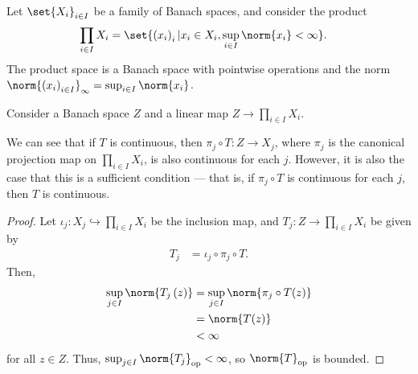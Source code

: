 \documentclass[10pt]{mypackage}
\begin{document}
  \begin{example}
    Let $\set{X_i}_{i\in I}$ be a family of Banach spaces, and consider the product
    \begin{align*}
      \prod_{i\in I}X_i &= \set{\left(x_i\right)_i| x_i\in X_i, \sup_{i\in I}\norm{x_i} < \infty}.
    \end{align*}
    The product space is a Banach space with pointwise operations and the norm $\norm{\left(x_i\right)_{i\in I}}_{\infty} = \sup_{i\in I}\norm{x_i}$.\newline

    Consider a Banach space $Z$ and a linear map $Z\rightarrow \prod_{i\in I}X_i$.\newline

    We can see that if $T$ is continuous, then $\pi_j\circ T: Z\rightarrow X_j$, where $\pi_j$ is the canonical projection map on $\prod_{i\in I}X_i$, is also continuous for each $j$. However, it is also the case that this is a sufficient condition --- that is, if $\pi_j\circ T$ is continuous for each $j$, then $T$ is continuous.
    \begin{proof}
      Let $\iota_j: X_j\hookrightarrow \prod_{i\in I}X_i$ be the inclusion map, and $T_j: Z\rightarrow \prod_{i\in I}X_i$ be given by
      \begin{align*}
        T_j &= \iota_j\circ \pi_j\circ T.
      \end{align*}
      Then,
      \begin{align*}
        \sup_{j\in I}\norm{T_j\left(z\right)} &= \sup_{j\in I}\norm{\pi_j\circ T(z)}\\
                                              &= \norm{T(z)}\\
                                              &< \infty
      \end{align*}
      for all $z\in Z$. Thus, $\sup_{j\in I}\norm{T_j}_{\text{op}} < \infty$, so $\norm{T}_{\text{op}}$ is bounded.
    \end{proof}
  \end{example}
\end{document}
